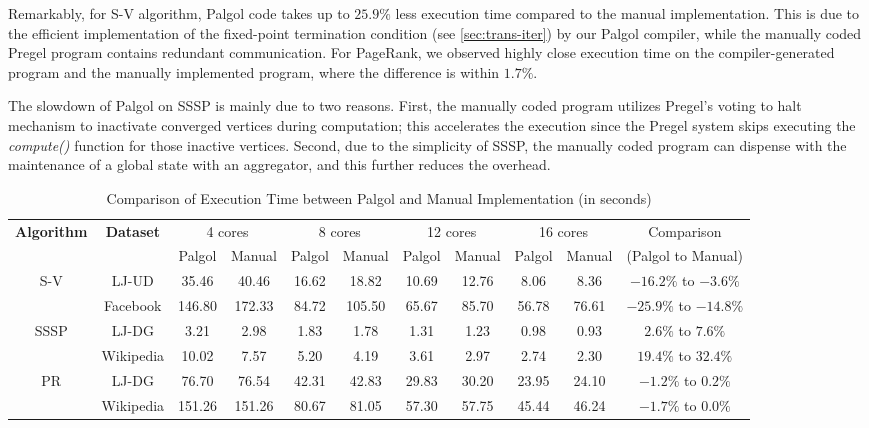 \documentclass{sokendai_thesis} %
\begin{document}
Remarkably, for S-V algorithm, Palgol code takes up to $25.9\%$ less execution time compared to the manual implementation.
This is due to the efficient implementation of the fixed-point termination condition (see \autoref{sec:trans-iter}) by our Palgol compiler, while the manually coded Pregel program contains redundant communication.
For PageRank, we observed highly close execution time on the compiler-generated program and the manually implemented program, where the difference is within $1.7\%$.

The slowdown of Palgol on SSSP is mainly due to two reasons.
First, the manually coded program utilizes Pregel's voting to halt mechanism to inactivate converged vertices during computation;  this accelerates the execution since the Pregel system skips executing the \emph{compute()} function for those inactive vertices.
Second, due to the simplicity of SSSP, the manually coded program can dispense with the maintenance of a global state with an aggregator, and this further reduces the overhead.

\begin{table}[t]
 \centering
 \caption{Comparison of Execution Time between Palgol and Manual Implementation (in seconds)}
 \label{tab:exec}
 \begin{tabular}{c|c||c|c||c|c||c|c||c|c||c}
  \hline
  \multirow{2}{*}{\textbf{Algorithm}} & \multirow{2}{*}{\textbf{Dataset}} & \multicolumn{2}{c||}{4 cores} & \multicolumn{2}{c||}{8 cores} & \multicolumn{2}{c||}{12 cores} & \multicolumn{2}{c||}{16 cores} & Comparison \\
  \cline{3-10}
  & & Palgol & Manual & Palgol & Manual & Palgol & Manual & Palgol & Manual & (Palgol to Manual) \\
  \hline\hline
  \multirow{2}{*}{S-V} & LJ-UD & 35.46 & 40.46 & 16.62 & 18.82 & 10.69 & 12.76 & 8.06 & 8.36 & $-16.2\%$ to $-3.6\%$ \\
  \cline{2-11}
  & Facebook & 146.80 & 172.33 & 84.72 & 105.50 & 65.67 & 85.70 & 56.78 & 76.61 & $-25.9\%$ to $-14.8\%$ \\
  \hline
  \multirow{2}{*}{SSSP} & LJ-DG & 3.21 & 2.98 & 1.83 & 1.78 & 1.31 & 1.23 & 0.98 & 0.93 & $2.6\%$ to $7.6\%$ \\
  \cline{2-11}
  & Wikipedia & 10.02 & 7.57 & 5.20 & 4.19 & 3.61 & 2.97 & 2.74 & 2.30 & $19.4\%$ to $32.4\%$ \\
  \hline
  \multirow{2}{*}{PR} & LJ-DG & 76.70 & 76.54 & 42.31 & 42.83 & 29.83 & 30.20 & 23.95 & 24.10 & $-1.2\%$ to $0.2\%$ \\
  \cline{2-11}
  & Wikipedia & 151.26 & 151.26 & 80.67 & 81.05 & 57.30 & 57.75 & 45.44 & 46.24 & $-1.7\%$ to $0.0\%$ \\
  \hline
 \end{tabular}
\end{table}
\end{document}
